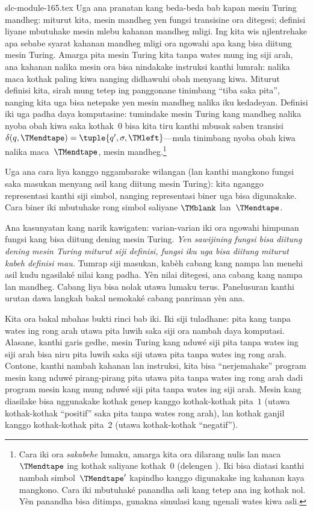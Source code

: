 \begin{filecontents*}[overwrite]{slc-module-165.tex}
Uga ana pranatan kang beda-beda bab kapan mesin Turing
mandheg: miturut kita, mesin mandheg yen fungsi transisine
ora ditegesi; definisi liyane mbutuhake mesin mlebu
kahanan mandheg mligi. Ing  kita wis
njlentrehake apa sebabe syarat kahanan mandheg mligi
ora ngowahi apa kang bisa diitung mesin Turing.
Amarga pita mesin Turing kita tanpa wates mung ing siji
arah, ana kahanan nalika mesin ora bisa nindakake
instruksi kanthi lumrah: nalika maca kothak paling kiwa
nanging didhawuhi obah menyang kiwa. Miturut definisi
kita, sirah mung tetep ing panggonane tinimbang
``tiba saka pita'', nanging kita uga bisa netepake
yen mesin mandheg nalika iku kedadeyan. Definisi iki
uga padha daya komputasine: tumindake mesin Turing kang
mandheg nalika nyoba obah kiwa saka kothak~$0$ bisa
kita tiru kanthi mbusak saben transisi
$\delta(q,\TMendtape) =
\tuple{q',\sigma,\TMleft}$---mula tinimbang nyoba
obah kiwa nalika maca~$\TMendtape$, mesin mandheg.\footnote{Cara iki
ora \emph{sakabehe} lumaku, amarga kita ora dilarang
nulis lan maca $\TMendtape$ ing kothak saliyane
kothak~$0$ (delengen ). Iki bisa
diatasi kanthi nambah simbol~$\TMendtape'$ kapindho
kanggo digunakake ing kahanan kaya mangkono. Cara iki mbutuhaké panandha asli kang tetep ana ing kothak nol. Yèn panandha bisa ditimpa, gunakna simulasi kang ngenali wates kiwa asli.}

Uga ana cara liya kanggo nggambarake wilangan
(lan kanthi mangkono fungsi saka masukan menyang asil kang diitung
mesin Turing): kita nganggo representasi kanthi siji
simbol, nanging representasi biner uga bisa digunakake.
Cara biner iki mbutuhake rong simbol saliyane
$\TMblank$ lan~$\TMendtape$.

Ana kasunyatan kang narik kawigaten: varian-varian iki
ora ngowahi himpunan fungsi kang bisa diitung dening
mesin Turing. \emph{Yen sawijining fungsi bisa diitung
dening mesin Turing miturut siji definisi, fungsi iku
uga bisa diitung miturut kabeh definisi mau.} Tumrap siji masukan, kabèh cabang kang nampa lan menehi asil kudu ngasilaké nilai kang padha. Yèn nilai ditegesi, ana cabang kang nampa lan mandheg. Cabang liya bisa nolak utawa lumaku terus. Panelusuran kanthi urutan dawa langkah bakal nemokaké cabang panriman yèn ana.

Kita ora bakal mbahas bukti rinci bab iki. Iki siji
tuladhane: pita kang tanpa wates ing rong arah utawa
pita luwih saka siji ora nambah daya komputasi.
Alasane, kanthi garis gedhe, mesin Turing kang nduwé
siji pita tanpa wates ing siji arah bisa niru pita
luwih saka siji utawa pita tanpa wates ing rong arah.
Contone, kanthi nambah kahanan lan instruksi, kita
bisa ``nerjemahake'' program mesin kang nduwé pirang-pirang
pita utawa pita tanpa wates ing rong arah dadi program
mesin kang mung nduwé siji pita tanpa wates ing siji
arah. Mesin kang diasilake bisa nggunakake kothak
genep kanggo kothak-kothak pita~$1$ (utawa kothak-kothak
``positif'' saka pita tanpa wates rong arah), lan
kothak ganjil kanggo kothak-kothak pita~$2$ (utawa
kothak-kothak ``negatif'').


\end{filecontents*}

